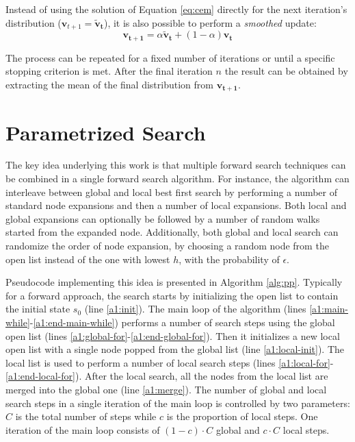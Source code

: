 \documentclass[letterpaper]{article} %
\begin{document}
Instead of using the solution of Equation \ref{eq:cem} directly for the next iteration's distribution ($\mathbf{v}_{t+1} = \mathbf{\tilde{v}_t}$), it is also possible to perform a \emph{smoothed} update:
\begin{equation}
    \mathbf{v_{t+1}} = \alpha{ \mathbf{\tilde{v}_t}} + (1-\alpha)\mathbf{v_t}
\end{equation}

The process can be repeated for a fixed number of iterations or until a specific stopping criterion is met. After the final iteration $n$ the result can be obtained by extracting the mean of the final distribution from $\mathbf{v_{t+1}}$.

\section{Parametrized Search} \label{sec:parametrized-search}


The key idea underlying this work is that multiple forward search techniques can be combined in a single forward search algorithm. For instance, the algorithm can interleave between global and local best first search by performing a number of standard node expansions and then a number of local expansions. Both local and global expansions can optionally be followed by a number of random walks started from the expanded node. Additionally, both global and local search can randomize the order of node expansion, by choosing a random node from the open list instead of the one with lowest $h$, with the probability of $\epsilon$.

Pseudocode implementing this idea is presented in Algorithm \ref{alg:pp}. Typically for a forward approach, the search starts by initializing the open list to contain the initial state $s_0$ (line \ref{a1:init}). The main loop of the algorithm (lines \ref{a1:main-while}-\ref{a1:end-main-while}) performs a number of search steps using the global open list (lines \ref{a1:global-for}-\ref{a1:end-global-for}). Then it initializes a new local open list with a single node popped from the global list (line \ref{a1:local-init}). The local list is used to perform a number of local search steps (lines \ref{a1:local-for}-\ref{a1:end-local-for}). After the local search, all the nodes from the local list are merged into the global one (line \ref{a1:merge}). The number of global and local search steps in a single iteration of the main loop is controlled by two parameters: $C$ is the total number of steps while $c$ is the proportion of local steps. One iteration of the main loop consists of $(1-c) \cdot C$ global and $c \cdot C$ local steps.
\end{document}
